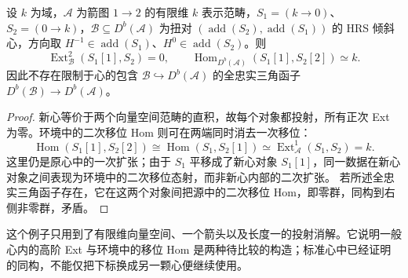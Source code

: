\begin{proposition}\label{b4:prop:heart-higher-ext-mismatch}
	设 \(k\) 为域，\(\mathcal A\) 为箭图 \(1\to2\) 的有限维 \(k\) 表示范畴，\(S_1=(k\to0)\)、\(S_2=(0\to k)\)，\(\mathcal B\subseteq D^b(\mathcal A)\) 为扭对 \((\operatorname{add}(S_2),\operatorname{add}(S_1))\) 的 HRS 倾斜心，方向取 \(H^{-1}\in\operatorname{add}(S_1)\)、\(H^0\in\operatorname{add}(S_2)\)。则
	\[
		\operatorname{Ext}_{\mathcal B}^2(S_1[1],S_2)=0, \qquad \operatorname{Hom}_{D^b(\mathcal A)}(S_1[1],S_2[2])\simeq k.
	\]
	因此不存在限制于心的包含 \(\mathcal B\hookrightarrow D^b(\mathcal A)\) 的全忠实三角函子 \(D^b(\mathcal B)\to D^b(\mathcal A)\)。
\end{proposition}
\begin{proof}
	新心等价于两个向量空间范畴的直积，故每个对象都投射，所有正次 Ext 为零。环境中的二次移位 Hom 则可在两端同时消去一次移位：
	\[
		\operatorname{Hom}(S_1[1],S_2[2]) \cong\operatorname{Hom}(S_1,S_2[1]) \simeq\operatorname{Ext}_{\mathcal A}^1(S_1,S_2)=k.
	\]
	这里仍是原心中的一次扩张；由于 \(S_1\) 平移成了新心对象 \(S_1[1]\)，同一数据在新心对象之间表现为环境中的二次移位态射，而非新心内部的二次扩张。 若所述全忠实三角函子存在，它在这两个对象间把源中的二次移位 Hom，即零群，同构到右侧非零群，矛盾。
\end{proof}

这个例子只用到了有限维向量空间、一个箭头以及长度一的投射消解。它说明一般心内的高阶 Ext 与环境中的移位 Hom 是两种待比较的构造；标准心中已经证明的同构，不能仅把下标换成另一颗心便继续使用。

